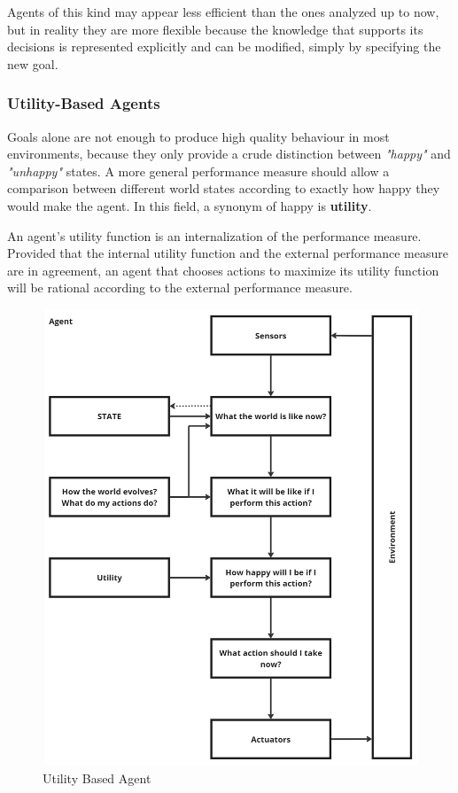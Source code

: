 \documentclass{article}
\begin{document}
Agents of this kind may appear less efficient than the ones analyzed up to now, but in reality they are more flexible because the knowledge that supports its decisions is represented explicitly and can be modified, simply by specifying the new goal.

\subsubsection{Utility-Based Agents}
Goals alone are not enough to produce high quality behaviour in most environments, because they only provide a crude distinction between \textit{"happy"} and \textit{"unhappy"} states. A more general performance measure should allow a comparison between different world states according to exactly how happy they would make the agent. In this field, a synonym of happy is \textbf{utility}.  

An agent's utility function is an internalization of the performance measure. Provided that the internal utility function and the external performance measure are in agreement, an agent that chooses actions to maximize its utility function will be rational according to the external performance measure. 

\begin{figure}[h]
    \centering
    \includegraphics[width=0.75\linewidth]{images/Utility Based Agent.jpg}
    \caption{Utility Based Agent}
    \label{fig:utility_based_agent}
\end{figure}
\end{document}

